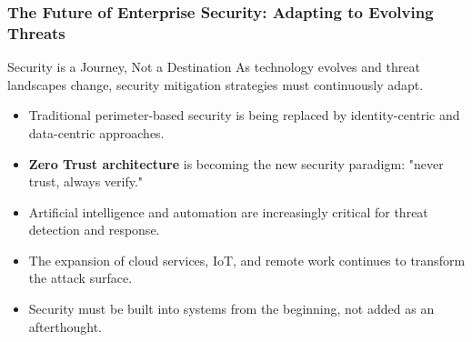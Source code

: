 \documentclass{beamer}
\begin{document}
    \begin{frame}
    \frametitle{The Future of Enterprise Security: Adapting to Evolving Threats}
    
    \begin{block}{Security is a Journey, Not a Destination}
    As technology evolves and threat landscapes change, security mitigation strategies must continuously adapt.
    \end{block}
    
    \begin{itemize}
    \item Traditional perimeter-based security is being replaced by identity-centric and data-centric approaches.
    \item \textbf{Zero Trust architecture} is becoming the new security paradigm: "never trust, always verify."
    \item Artificial intelligence and automation are increasingly critical for threat detection and response.
    \item The expansion of cloud services, IoT, and remote work continues to transform the attack surface.
    \item Security must be built into systems from the beginning, not added as an afterthought.
    \end{itemize}
    
\end{frame}
\end{document}

